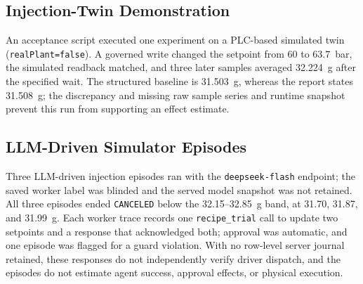 \subsection{Injection-Twin Demonstration}
\label{sec:eval-twin-pilot}
An acceptance script executed one experiment on a PLC-based simulated twin (\texttt{realPlant=false}). A governed write changed the setpoint from 60 to 63.7~bar, the simulated readback matched, and three later samples averaged 32.224~g after the specified wait. The structured baseline is 31.503~g, whereas the report states 31.508~g; the discrepancy and missing raw sample series and runtime snapshot prevent this run from supporting an effect estimate.

\subsection{LLM-Driven Simulator Episodes}
\label{sec:eval-agent}
Three LLM-driven injection episodes ran with the \texttt{deepseek-flash} endpoint; the saved worker label was blinded and the served model snapshot was not retained. All three episodes ended \texttt{CANCELED} below the 32.15--32.85~g band, at 31.70, 31.87, and 31.99~g. Each worker trace records one \texttt{recipe\_trial} call to update two setpoints and a response that acknowledged both; approval was automatic, and one episode was flagged for a guard violation. With no row-level server journal retained, these responses do not independently verify driver dispatch, and the episodes do not estimate agent success, approval effects, or physical execution.

